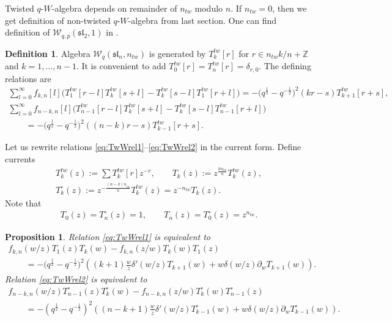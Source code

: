 \documentclass[pdftex]{sigma}
\numberwithin{equation}{section}
\newtheorem{Proposition}[Theorem]{Proposition}
\theoremstyle{definition}
\newtheorem{Definition}[Theorem]{Definition}
\newcommand{\half}{\frac{1}{2}}
\newcommand{ \twW }{ \mathcal{W}_{q} ( \mathfrak{sl}_n, n_{tw} ) }
\newcommand{\tT}{T^{tw}}
\begin{document}
Twisted $q$-${W}$-algebra depends on remainder of $n_{tw}$ modulo $n$. If $n_{tw}=0$, then we get definition of non-twisted $q$-${W}$-algebra from last section. One can find definition of $\mathcal{W}_{q,p}(\mathfrak{sl}_2, 1)$ in \cite[equations~(37)--(38)]{Sh}.

\begin{Definition} \label{def: twisted W}
Algebra $\twW$ is generated by $\tT_k[r]$ for $r \in n_{tw} k/n + \mathbb{Z}$ and $k= 1, \dots, n-1$. It is convenient to add $\tT_0[r]=\tT_n[r] = \delta_{r,0}$. The defining relations are
\begin{gather}
\sum_{l=0}^{\infty} f_{k,n}[l] \big( \tT_1[r{-}l] \tT_k[s{+}l] - \tT_k[s{-}l] \tT_1[r{+}l] \big) = -\big(q^{\half}-q^{-\half}\big)^2 (kr-s) \tT_{k+1}[r{+}s], \!\!\!\label{eq:TwWrel1} \\
\sum_{l=0}^{\infty} f_{n-k,n}[l] \big( \tT_{n-1} [r{-}l] \tT_k[s{+}l] - \tT_k[s{-}l] \tT_{n-1}[r{+}l] \big)\nonumber\\
\qquad{} = -\big(q^{\half}-q^{-\half}\big)^2 ((n{-}k)r-s ) \tT_{k{-}1}[r{+}s]. \label{eq:TwWrel2}
\end{gather}
\end{Definition}

Let us rewrite relations \eqref{eq:TwWrel1}--\eqref{eq:TwWrel2} in the current form. Define currents
\begin{gather*}
T_k^{tw}(z) := \sum T_k^{tw}[r] z^{-r}, \qquad T_k (z) := z^{ \frac{ \scriptstyle{kn}_{ \scriptscriptstyle{tw} }}{\scriptstyle{n}} } T_k^{tw}(z), \\
T^{\circ}_k (z) := z^{-\frac{\scriptstyle{(n-k) n}_{tw}}{\scriptstyle{n}} } T^{tw}_k (z) = z^{-n_{tw}} T_k(z).
\end{gather*}
Note that
\begin{gather}\label{eq:T boundary}
T_0(z)=T^{\circ}_n(z)=1, \qquad T_n(z) = T^{\circ}_0(z)= z^{n_{tw}}.
\end{gather}
\begin{Proposition}
Relation \eqref{eq:TwWrel1} is equivalent to
\begin{gather}
f_{k,n} (w/z) T_1(z) T_k (w) - f_{k,n}(z/w) T_k(w) T_1 (z) \nonumber\\
\qquad{} = -\big(q^{\half}-q^{-\half}\big)^2 \left( (k+1) \frac{w}{z} \delta' (w/z) T_{k+1} (w) + w \delta (w/z) \partial_w T_{k+1} (w) \right). \label{relation:currentTW1}
\end{gather}
Relation \eqref{eq:TwWrel2} is equivalent to
\begin{gather*}
f_{n-k,n} (w/z) T^{\circ}_{n-1}(z) T^{\circ}_k (w) - f_{n-k,n}(z/w) T^{\circ}_k(w) T^{\circ}_{n-1} (z) \nonumber\\ \qquad{}=-(q^{\half}-q^{-\half})^2 \left( (n-k+1) \frac{w}{z} \delta' (w/z) T^{\circ}_{k-1} (w) + w \delta(w/z) \partial_w T^{\circ}_{k-1} (w) \right). %
\end{gather*}
\end{Proposition}
\end{document}
